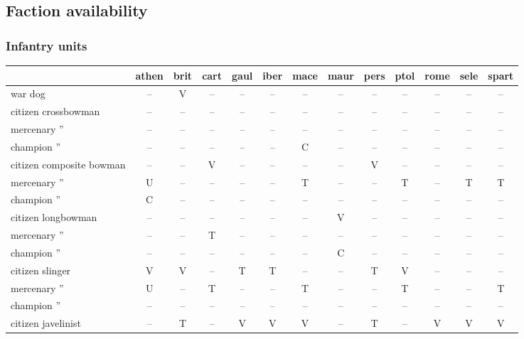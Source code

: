 \documentclass{article}
\begin{document}
\clearpage
\subsection{Faction availability}
\subsubsection{Infantry units}
\begin{tabular}{l|cccc|cccc|cccc}
 & athen & brit & cart & gaul & iber & mace & maur & pers & ptol & rome & sele & spart \\
\hline
war dog                               & -- & V  & -- & -- & -- & -- & -- & -- & -- & -- & -- & -- \\
\hline
citizen crossbowman                   & -- & -- & -- & -- & -- & -- & -- & -- & -- & -- & -- & -- \\
mercenary ''                          & -- & -- & -- & -- & -- & -- & -- & -- & -- & -- & -- & -- \\
champion  ''                          & -- & -- & -- & -- & -- & C  & -- & -- & -- & -- & -- & -- \\
\hline
citizen composite bowman              & -- & -- & V  & -- & -- & -- & -- & V  & -- & -- & -- & -- \\
mercenary ''                          & U  & -- & -- & -- & -- & T  & -- & -- & T  & -- & T  & T  \\
champion  ''                          & C  & -- & -- & -- & -- & -- & -- & -- & -- & -- & -- & -- \\
\hline
citizen longbowman                    & -- & -- & -- & -- & -- & -- & V  & -- & -- & -- & -- & -- \\
mercenary ''                          & -- & -- & T  & -- & -- & -- & -- & -- & -- & -- & -- & -- \\
champion  ''                          & -- & -- & -- & -- & -- & -- & C  & -- & -- & -- & -- & -- \\
\hline
citizen slinger                       & V  & V  & -- & T  & T  & -- & -- & T  & V  & -- & -- & -- \\
mercenary ''                          & U  & -- & T  & -- & -- & T  & -- & -- & T  & -- & -- & T  \\
champion  ''                          & -- & -- & -- & -- & -- & -- & -- & -- & -- & -- & -- & -- \\
\hline
citizen javelinist                    & -- & T  & -- & V  & V  & V  & -- & T  & -- & V  & V  & V  \\

\end{tabular}
\end{document}
